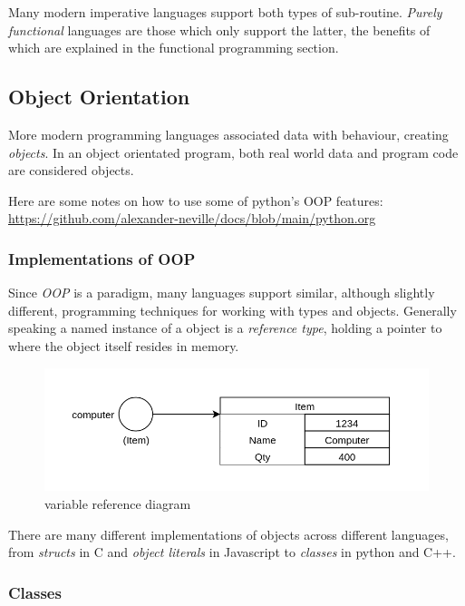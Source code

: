 \documentclass[9pt]{article}
\begin{document}
Many modern imperative languages support both types of sub-routine. \emph{Purely functional} languages are those which only support the latter, the benefits of which are explained in the functional programming section.

\subsection{Object Orientation}
\label{sec:orgf7638bf}

More modern programming languages associated data with behaviour, creating \emph{objects}. In an object orientated program, both real world data and program code are considered objects.

Here are some notes on how to use some of python's OOP features: \url{https://github.com/alexander-neville/docs/blob/main/python.org}

\subsubsection{Implementations of OOP}
\label{sec:orgbe7d45b}

Since \emph{OOP} is a paradigm, many languages support similar, although slightly different, programming techniques for working with types and objects. Generally speaking a named instance of a object is a \emph{reference type}, holding a pointer to where the object itself resides in memory.

\begin{figure}[htbp]
\centering
\includegraphics[width=.9\linewidth]{./images/reference.png}
\caption{variable reference diagram}
\end{figure}

There are many different implementations of objects across different languages, from \emph{structs} in C and \emph{object literals} in Javascript to \emph{classes} in python and C++.

\subsubsection{Classes}
\label{sec:org5d5f3b3}
\end{document}

